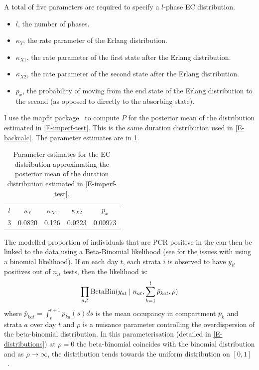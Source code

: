 \documentclass[thesis.tex]{subfiles}
\begin{document}
A total of five parameters are required to specify a $l$-phase EC distribution.
\begin{itemize}
    \item $l$, the number of phases.
    \item $\kappa_Y$, the rate parameter of the Erlang distribution.
    \item $\kappa_{X1}$, the rate parameter of the first state after the Erlang distribution.
    \item $\kappa_{X2}$, the rate parameter of the second state after the Erlang distribution.
    \item $p_x$, the probability of moving from the end state of the Erlang distribution to the second (as opposed to directly to the absorbing state).
\end{itemize}

I use the mapfit package~\autocite{mapfit} to compute $P$ for the posterior mean of the distribution estimated in \cref{E-imperf-test}.
This is the same duration distribution used in \cref{E-backcalc}.
The parameter estimates are in \cref{SEIR:table:ec-params}.
\begin{table}
    \centering
    \begin{tabular}{c c c c c}
        $l$ & $\kappa_Y$ & $\kappa_{X1}$ & $\kappa_{X2}$ & $p_x$ \\
        3 & 0.0820 & 0.126 & 0.0223 & 0.00973  \\
    \end{tabular}
    \caption{Parameter estimates for the EC distribution approximating the posterior mean of the duration distribution estimated in \cref{E-imperf-test}.}
    \label{SEIR:table:ec-params}
\end{table}

The modelled proportion of individuals that are PCR positive in the can then be linked to the data using a Beta-Binomial likelihood (see for the issues with using a binomial likelihood).
If on each day $t$, each strata $i$ is observed to have $y_{it}$ positives out of $n_{it}$ tests, then the likelihood is:
\begin{align}
    \prod_{a,t} \operatorname{BetaBin} (y_{at} \mid n_{at}, \sum_{k=1}^l \bar{p}_{kat}, \rho)
    \label{SEIR:eq:likelihood}
\end{align}
where $\bar{p}_{kat} = \int_{t}^{t+1} p_{ka}(s) ds$ is the mean occupancy in compartment $p_k$ and strata $a$ over day $t$ and $\rho$ is a nuisance parameter controlling the overdispersion of the beta-binomial distribution.
In this parameterisation (detailed in \cref{E-distributions}) at $\rho=0$ the beta-binomial coincides with the binomial distribution and as $\rho \to \infty$, the distribution tends towards the uniform distribution on $[0, 1]$~\autocite{hughesUsing}.
\end{document}
